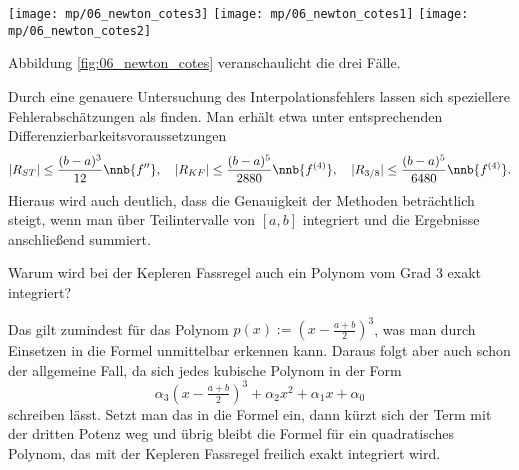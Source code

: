 \begin{antwort}
    \begin{center}
      \begin{minipage}{\textwidth}
        \texttt{[image: mp/06\_newton\_cotes3]}\quad
        \texttt{[image: mp/06\_newton\_cotes1]}\quad
        \texttt{[image: mp/06\_newton\_cotes2]}
      \end{minipage}
      \label{fig:06_newton_cotes}
    \end{center}

    Abbildung \ref{fig:06_newton_cotes} veranschaulicht die drei Fälle.

    \noindent
    Durch eine genauere Untersuchung des Interpolationsfehlers lassen 
    sich speziellere Fehlerabschätzungen als {\astref} finden. 
    Man erhält etwa unter entsprechenden Differenzierbarkeitsvoraussetzungen  
    \begin{equation}
      |R_{ST}| \le \frac{(b-a)^3}{12} \nnb{f''}, \quad
      |R_{KF}| \le \frac{(b-a)^5}{2880} \nnb{f^{(4)}}, \quad
      |R_{3/8}| \le \frac{(b-a)^5}{6480} \nnb{f^{(4)}}.
      \notag
    \end{equation} 
    Hieraus wird auch deutlich, dass die Genauigkeit 
    der Methoden beträchtlich steigt, wenn man über Teilintervalle 
    von $[a,b]$ integriert und die Ergebnisse anschließend summiert. \AntEnd
  \end{antwort}

  \begin{frage}
    Warum wird bei der Kepler\sch en Fassregel auch ein Polynom vom Grad 
    $3$ exakt integriert?
  \end{frage}

  \begin{antwort}
    
    Das gilt zumindest für das Polynom  
    $p(x) := \left( x-\frac{a+b}{2} \right)^3$, was man durch Einsetzen 
    in die Formel unmittelbar erkennen kann. 
    Daraus folgt aber auch schon der allgemeine Fall, da sich jedes 
    kubische Polynom in der Form 
    \[
    \alpha_3 \left( x-\tfrac{a+b}{2} \right)^3 + 
    \alpha_2 x^2 + 
    \alpha_1 x + 
    \alpha_0
    \]
    schreiben lässt. Setzt man das in die Formel ein, dann kürzt sich der 
    Term mit der dritten Potenz weg und übrig bleibt die Formel für ein 
    quadratisches Polynom, das mit der Kepler\sch en Fassregel 
    freilich exakt integriert wird.\AntEnd 
  \end{antwort}  





